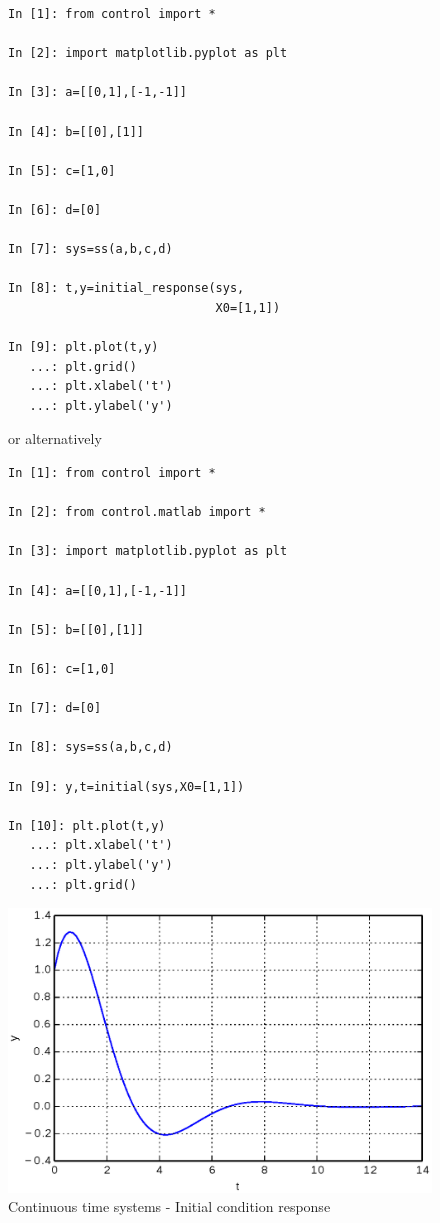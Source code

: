 \begin{figure}[htbp]	%
\begin{minipage}[t]{0.55\textwidth}
  \vspace{0pt}
\begin{lstlisting}[linewidth=7cm,xleftmargin=0cm]
In [1]: from control import *

In [2]: import matplotlib.pyplot as plt

In [3]: a=[[0,1],[-1,-1]]

In [4]: b=[[0],[1]]

In [5]: c=[1,0]

In [6]: d=[0]

In [7]: sys=ss(a,b,c,d)

In [8]: t,y=initial_response(sys,
                             X0=[1,1])

In [9]: plt.plot(t,y)
   ...: plt.grid()
   ...: plt.xlabel('t')
   ...: plt.ylabel('y')
\end{lstlisting}

or alternatively

\begin{lstlisting}[linewidth=7cm,xleftmargin=0cm]
In [1]: from control import *

In [2]: from control.matlab import *

In [3]: import matplotlib.pyplot as plt

In [4]: a=[[0,1],[-1,-1]]

In [5]: b=[[0],[1]]

In [6]: c=[1,0]

In [7]: d=[0]

In [8]: sys=ss(a,b,c,d)

In [9]: y,t=initial(sys,X0=[1,1])

In [10]: plt.plot(t,y)
   ...: plt.xlabel('t')
   ...: plt.ylabel('y')
   ...: plt.grid()
\end{lstlisting}
\end{minipage}%
\begin{minipage}[t]{0.5\textwidth}
  \vspace{0pt} \centering
  \includegraphics[width=\textwidth]{eps/initial.eps}
\end{minipage}
\caption{Continuous time systems - Initial condition response}
\label{F3}
\end{figure}

